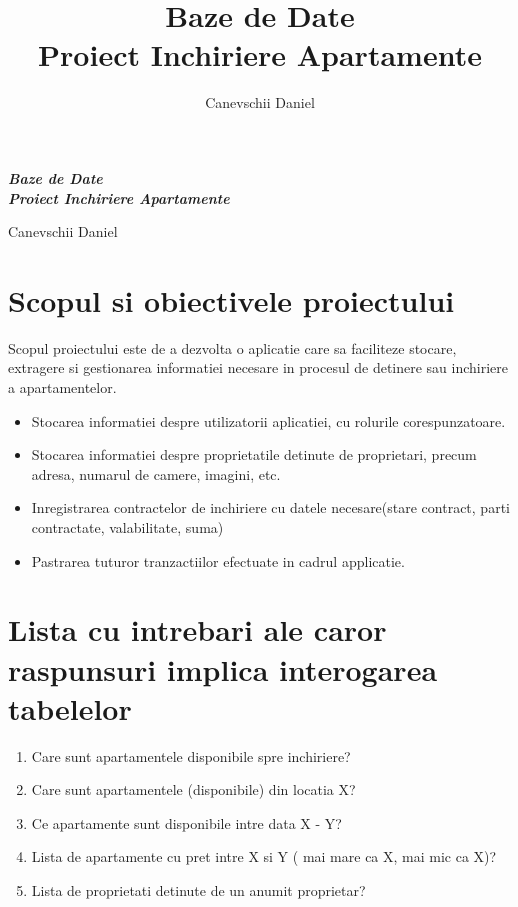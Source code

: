 \documentclass[12pt]{article} %
\title{Baze de Date \\ Proiect Inchiriere Apartamente}
\author{Canevschii Daniel}
\date{}
\begin{document}
\begin{titlepage}
    \centering
    \vspace*{\fill}

    \vspace*{0.5cm}

    \huge\bfseries
    \textit{Baze de Date \\ Proiect Inchiriere Apartamente}

    \vspace*{0.5cm}

    \large Canevschii Daniel

    \vspace*{\fill}
\end{titlepage}

\newpage
\tableofcontents
\newpage
\section{Scopul si obiectivele proiectului}
Scopul proiectului este de a dezvolta o aplicatie care sa faciliteze stocare, extragere si gestionarea informatiei necesare in procesul de detinere sau inchiriere a apartamentelor.
\begin{itemize}
\item Stocarea informatiei despre utilizatorii aplicatiei, cu rolurile corespunzatoare.
\item Stocarea informatiei despre proprietatile detinute de proprietari, precum adresa, numarul de camere, imagini, etc.
\item Inregistrarea contractelor de inchiriere cu datele necesare(stare contract, parti contractate, valabilitate, suma)
\item Pastrarea tuturor tranzactiilor efectuate in cadrul applicatie.
\end{itemize}

\section{Lista cu intrebari ale caror raspunsuri implica interogarea tabelelor} %
\begin{enumerate}
\item Care sunt apartamentele disponibile spre inchiriere?
\item Care sunt apartamentele (disponibile) din locatia X?
\item Ce apartamente sunt disponibile intre data X - Y?
\item Lista de apartamente cu pret intre X si Y ( mai mare ca X, mai mic ca X)?
\item Lista de proprietati detinute de un anumit proprietar?
\end{enumerate}
\end{document}
